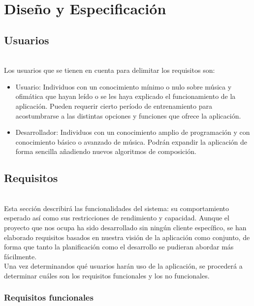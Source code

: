 \chapter{Diseño y Especificación}
\label{chap:diseno}

\section{Usuarios}
\label{sec:users}
\\
	Los usuarios que se tienen en cuenta para delimitar los requisitos son:
	
	\begin{itemize}
		\item Usuario: Individuos con un conocimiento mínimo o nulo sobre música y ofimática que hayan leído o se les haya explicado el funcionamiento de la aplicación. Pueden requerir cierto período de entrenamiento para acostumbrarse a las distintas opciones y funciones que ofrece la aplicación.
		\item Desarrollador: Individuos con un conocimiento amplio de programación y con conocimiento básico o avanzado de música. Podrán expandir la aplicación de forma sencilla añadiendo nuevos algoritmos de composición.
		
	\end{itemize}


\section{Requisitos}
\label{sec:requisitos}
\\
	Esta sección describirá las funcionalidades del sistema: su comportamiento esperado así como sus restricciones de rendimiento y capacidad. Aunque el proyecto que nos ocupa ha sido desarrollado sin ningún cliente específico, se han elaborado requisitos basados en nuestra visión de la aplicación como conjunto, de forma que tanto la planificación como el desarrollo se pudieran abordar más fácilmente.\\
	
	Una vez determinandos qué usuarios harán uso de la aplicación, se procederá a determinar cuáles son los requisitos funcionales y los no funcionales.
	
	\subsection{Requisitos funcionales}
	
